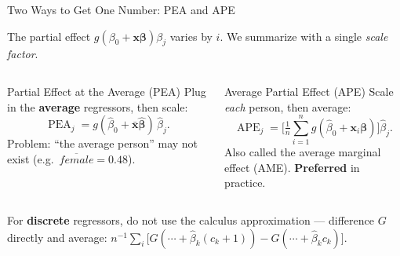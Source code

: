 \documentclass[aspectratio=169, 12pt]{beamer}
\newcommand{\xbeta}{\mathbf{x}\boldsymbol{\beta}}   %
\newcommand{\xib}{\mathbf{x}_i\boldsymbol{\beta}}    %
\newcommand{\xbar}{\bar{\mathbf{x}}}                 %
\DeclareMathOperator{\APE}{APE}
\DeclareMathOperator{\PEA}{PEA}
\begin{document}
\begin{frame}[shrink=12]{Two Ways to Get One Number: PEA and APE}

  The partial effect $g(\beta_0+\xbeta)\beta_j$ varies by $i$. We summarize with
  a single \emph{scale factor}.

  \smallskip

  \begin{columns}[t]
    \begin{definitionbox}{Partial Effect at the Average (PEA)}
      Plug in the \textbf{average} regressors, then scale:
      \[
        \PEA_j = g(\hat\beta_0 + \xbar\hat{\boldsymbol\beta})\,\hat\beta_j .
      \]
      Problem: ``the average person'' may not exist (e.g.\ $\overline{female}=0.48$).
    \end{definitionbox}

    \begin{definitionbox}{Average Partial Effect (APE)}
      Scale \emph{each} person, then average:
      \[
        \APE_j = \Big[\tfrac{1}{n}\sum_{i=1}^{n} g(\hat\beta_0+\xib)\Big]\hat\beta_j .
      \]
      Also called the average marginal effect (AME). \textbf{Preferred} in practice.
    \end{definitionbox}
  \end{columns}

  \smallskip

  \begin{keybox}
    For \textbf{discrete} regressors, do not use the calculus approximation ---
    difference $G$ directly and average:
    \(
      n^{-1}\sum_i \big[G(\cdots + \hat\beta_k(c_k+1)) - G(\cdots + \hat\beta_k c_k)\big].
    \)
  \end{keybox}

\end{frame}
\end{document}
